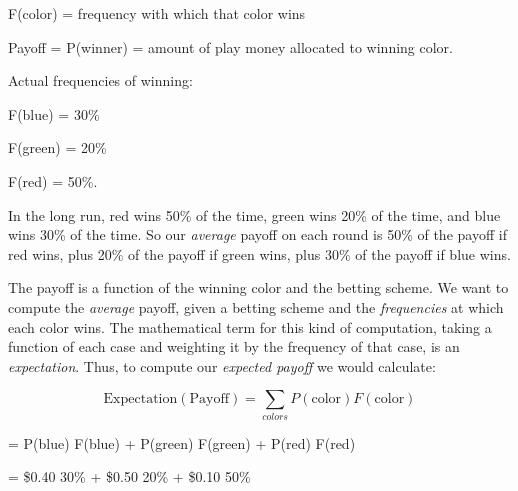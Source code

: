 \bigskip

{\centering
 F(color) = frequency with which that color wins
\par}


\bigskip

{\centering
 Payoff = P(winner) = amount of play money allocated to winning
color.
\par}


\bigskip

{
 Actual frequencies of winning:}

{\centering
 F(blue) = 30\%
\par}


\bigskip

{\centering
 F(green) = 20\%
\par}


\bigskip

{\centering
 F(red) = 50\%.
\par}


\bigskip

{
 In the long run, red wins 50\% of the time, green wins 20\% of the
time, and blue wins 30\% of the time. So our \textit{average} payoff on
each round is 50\% of the payoff if red wins, plus 20\% of the payoff
if green wins, plus 30\% of the payoff if blue wins.}

{
 The payoff is a function of the winning color and the betting
scheme. We want to compute the \textit{average} payoff, given a betting
scheme and the \textit{frequencies} at which each color wins. The
mathematical term for this kind of computation, taking a function of
each case and weighting it by the frequency of that case, is an
\textit{expectation}. Thus, to compute our \textit{expected payoff} we
would calculate:}


\begin{equation*}
  \text{Expectation}(\text{Payoff}) = \sum_{colors} P(\text{color}) F(\text{color})
\end{equation*}


\bigskip

{\centering
 = P(blue) {\texttimes} F(blue) + P(green) {\texttimes} F(green) +
P(red) {\texttimes} F(red)
\par}


\bigskip

{\centering
 = \$0.40 {\texttimes} 30\% + \$0.50 {\texttimes} 20\% + \$0.10
{\texttimes} 50\%
\par}


